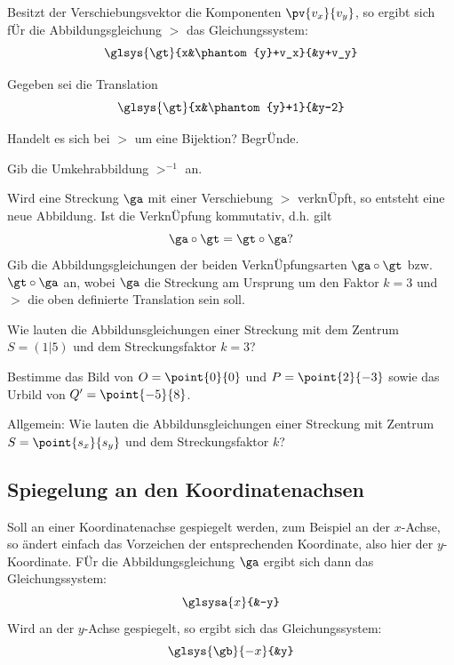 \documentclass[%
11pt,%
twoside,%
titlepage,%
german,%
headsepline%
]{scrartcl}
\begin{document}
Besitzt der Verschiebungsvektor die Komponenten $\pv{v_x}{v_y}$, so ergibt sich f\"Ur die Abbildungsgleichung $\gt$ das Gleichungssystem:
$$\glsys{\gt}{x&\phantom{y}+v_x}{&y+v_y}$$

\begin{ueb}
Gegeben sei die Translation
$$\glsys{\gt}{x&\phantom{y}+1}{&y-2}$$
\begin{enumeratea}
\item Handelt es sich bei $\gt$ um eine Bijektion? Begr\"Unde.
\item Gib die Umkehrabbildung $\gt^{-1}$ an.
\item Wird eine Streckung $\ga$ mit einer Verschiebung $\gt$ verkn\"Upft, so entsteht eine neue Abbildung. Ist die Verkn\"Upfung kommutativ, d.h. gilt
$$\ga\circ\gt=\gt\circ\ga?$$
Gib die Abbildungsgleichungen der beiden Verkn\"Upfungsarten $\ga\circ\gt$ bzw. $\gt\circ\ga$ an, wobei $\ga$ die Streckung am Ursprung um den Faktor $k = 3$ und $\gt$ die oben definierte Translation sein soll.
\item Wie lauten die Abbildunsgleichungen einer Streckung mit dem Zentrum $S=(1|5)$ und dem Streckungsfaktor $k = 3$?

Bestimme das Bild von $O=\point{0}{0}$ und $P =\point{2}{-3}$ sowie das Urbild von $Q' =\point{-5}{8}$.
\item Allgemein: Wie lauten die Abbildunsgleichungen einer Streckung mit Zentrum $S =\point{s_x}{s_y}$ und dem Streckungsfaktor $k$?
\end{enumeratea}
\end{ueb}

\subsection{Spiegelung an den Koordinatenachsen}
Soll an einer Koordinatenachse gespiegelt werden, zum Beispiel an der $x$-Achse, so ändert einfach das Vorzeichen der entsprechenden Koordinate, also hier der $y$-Koordinate. F\"Ur die Abbildungsgleichung $\ga$ ergibt sich dann das Gleichungssystem:
$$\glsysa{x}{&-y}$$
Wird an der $y$-Achse gespiegelt, so ergibt sich das Gleichungssystem:
$$\glsys{\gb}{-x}{&y}$$
\end{document}
